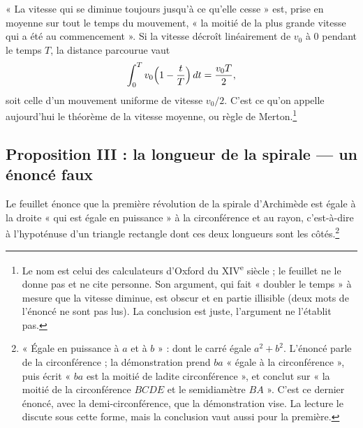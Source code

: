 \documentclass[11pt,a4paper]{article}
\begin{document}
« La vitesse qui se diminue toujours jusqu'à ce qu'elle cesse » est, prise en
moyenne sur tout le temps du mouvement, « la moitié de la plus grande vitesse
qui a été au commencement ». Si la vitesse décroît linéairement de \(v_0\) à
\(0\) pendant le temps \(T\), la distance parcourue vaut
\[
\int_0^T v_0\Bigl(1-\frac{t}{T}\Bigr)\,dt = \frac{v_0T}{2},
\]
soit celle d'un mouvement uniforme de vitesse \(v_0/2\). C'est ce qu'on appelle
aujourd'hui le théorème de la vitesse moyenne, ou règle de Merton.\footnote{Le
nom est celui des calculateurs d'Oxford du XIV\textsuperscript{e} siècle ; le
feuillet ne le donne pas et ne cite personne. Son argument, qui fait « doubler
le temps » à mesure que la vitesse diminue, est obscur et en partie illisible
(deux mots de l'énoncé ne sont pas lus). La conclusion est juste, l'argument ne
l'établit pas.}

\subsection*{Proposition III : la longueur de la spirale — un énoncé faux}

Le feuillet énonce que la première révolution de la spirale d'Archimède est
égale à la droite « qui est égale en puissance » à la circonférence et au
rayon, c'est-à-dire à l'hypoténuse d'un triangle rectangle dont ces deux
longueurs sont les côtés.\footnote{« Égale en puissance à \(a\) et à \(b\) » :
dont le carré égale \(a^2+b^2\). L'énoncé parle de la circonférence ; la
démonstration prend \(ba\) « égale à la circonférence », puis écrit « \(ba\) est
la moitié de ladite circonférence », et conclut sur « la moitié de la
circonférence \(BCDE\) et le semidiamètre \(BA\) ». C'est ce dernier énoncé,
avec la demi-circonférence, que la démonstration vise. La lecture le discute
sous cette forme, mais la conclusion vaut aussi pour la première.}
\end{document}
